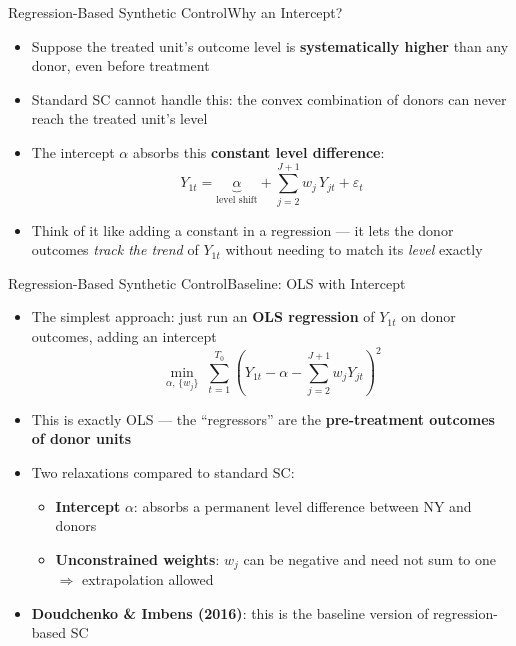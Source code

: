 \documentclass[hyperref={pdfpagelabels=false}]{beamer}
\begin{document}
\begin{frame}{Regression-Based Synthetic Control}{Why an Intercept?}
\begin{itemize}
	\item Suppose the treated unit's outcome level is \textbf{systematically higher} than any donor, even before treatment
	\vspace{0.3cm}
	\item Standard SC cannot handle this: the convex combination of donors can never reach the treated unit's level
	\vspace{0.3cm}
	\item The intercept $\alpha$ absorbs this \textbf{constant level difference}:
	\begin{equation*}
		Y_{1t} = \underbrace{\alpha}_{\text{level shift}} + \sum_{j=2}^{J+1} w_j\,Y_{jt} + \varepsilon_t
	\end{equation*}
	\vspace{0.2cm}
	\item Think of it like adding a constant in a regression --- it lets the donor outcomes \emph{track the trend} of $Y_{1t}$ without needing to match its \emph{level} exactly
\end{itemize}
\end{frame}


\begin{frame}{Regression-Based Synthetic Control}{Baseline: OLS with Intercept}
\begin{itemize}
	\item The simplest approach: just run an \textbf{OLS regression} of $Y_{1t}$ on donor outcomes, adding an intercept
	\begin{equation*}
		\min_{\alpha,\,\{w_j\}}\;
		\sum_{t=1}^{T_0}\!\left(Y_{1t} - \alpha - \sum_{j=2}^{J+1}w_j Y_{jt}\right)^{\!2}
	\end{equation*}
	\vspace{0.1cm}
	\item This is exactly OLS --- the ``regressors'' are the \textbf{pre-treatment outcomes of donor units}
	\vspace{0.2cm}
	\item Two relaxations compared to standard SC:
	\begin{itemize}
		\vspace{0.1cm}
		\item \textbf{Intercept} $\alpha$: absorbs a permanent level difference between NY and donors
		\vspace{0.1cm}
		\item \textbf{Unconstrained weights}: $w_j$ can be negative and need not sum to one $\Rightarrow$ extrapolation allowed
	\end{itemize}
	\vspace{0.2cm}
	\item \textbf{Doudchenko \& Imbens (2016)}: this is the baseline version of regression-based SC
\end{itemize}
\end{frame}
\end{document}

